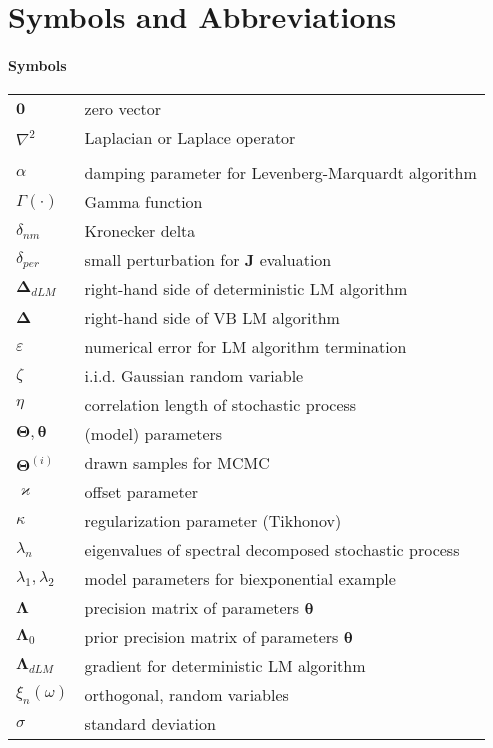 \chapter*{Symbols and Abbreviations}

\subsubsection*{Symbols}
\begin{longtable}{p{4cm} l}

  $\bm{0}$ & zero vector \\
  $\nabla^2$ & Laplacian or Laplace operator \\
  & \\
  $\alpha$ & damping parameter for Levenberg-Marquardt algorithm \\
  $\Gamma(\cdot)$ & Gamma function \\
  $\delta_{nm}$ & Kronecker delta \\
  $\delta_{per}$ & small perturbation for $\bm{J}$ evaluation \\
  $\bm{\Delta}_{dLM}$ & right-hand side of deterministic LM algorithm \\
  $\bm{\Delta}$ & right-hand side of VB LM algorithm \\
  $\varepsilon$ & numerical error for LM algorithm termination \\
  $\zeta$ & i.i.d. Gaussian random variable \\
  $\eta$ & correlation length of stochastic process \\
  $\bm{\Theta}, \bm{\theta}$ & (model) parameters \\
  $\bm{\Theta}^{(i)}$ & drawn samples for MCMC \\
  $\varkappa$ & offset parameter \\
  $\kappa$ & regularization parameter (Tikhonov) \\
  $\lambda_n$ & eigenvalues of spectral decomposed stochastic process \\
  $\lambda_1, \lambda_2$ & model parameters for biexponential example \\
  $\bm{\Lambda}$ & precision matrix of parameters $\bm{\theta}$ \\
  $\bm{\Lambda}_0$ & prior precision matrix of parameters $\bm{\theta}$ \\
  $\bm{\Lambda}_{dLM}$ & gradient for deterministic LM algorithm \\
  $\xi_n(\omega)$ & orthogonal, random variables \\
  $\sigma$ & standard deviation \\

\end{longtable}
